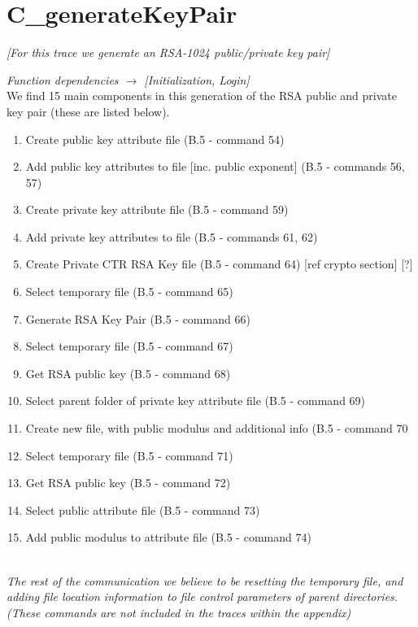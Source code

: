 \documentclass[bsc,frontabs,twoside,singlespacing,parskip,deptreport]{infthesis}     %
\begin{document}
\section{C\_generateKeyPair}
\textit{[For this trace we generate an RSA-1024 public/private key pair]}

\textit{Function dependencies $\rightarrow$ [Initialization, Login]}\\

We find 15 main components in this generation of the RSA public and private key pair (these are listed below).

\begin{enumerate}
\item Create public key attribute file (B.5 - command 54)
\item Add public key attributes to file [inc. public exponent] (B.5 - commands 56, 57)
\item Create private key attribute file (B.5 - command 59)
\item Add private key attributes to file (B.5 - commands 61, 62)
\item Create Private CTR RSA Key file (B.5 - command 64) [ref crypto section] [?]
\item Select temporary file (B.5 - command 65)
\item Generate RSA Key Pair (B.5 - command 66)
\item Select temporary file (B.5 - command 67)
\item Get RSA public key (B.5 - command 68)
\item Select parent folder of private key attribute file (B.5 - command 69)
\item Create new file, with public modulus and additional info (B.5 - command 70
\item Select temporary file (B.5 - command 71)
\item Get RSA public key (B.5 - command 72)
\item Select public attribute file (B.5 - command 73)
\item Add public modulus to attribute file (B.5 - command 74)\\\\
\end{enumerate}

\textit{The rest of the communication we believe to be resetting the temporary file, and adding file location information to file control parameters of parent directories. (These commands are not included in the traces within the appendix)}
\end{document}
